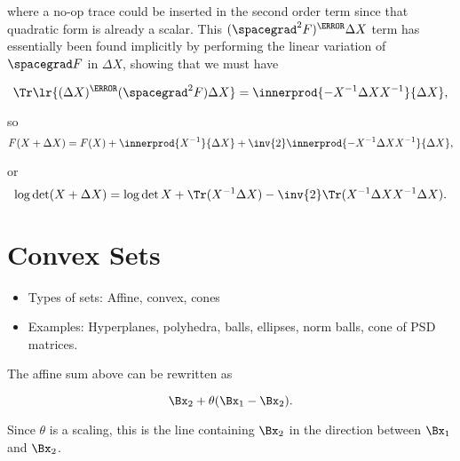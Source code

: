 where a no-op trace could be inserted in the second order term since that quadratic form is already a scalar.
This \( (\spacegrad^2 F)^\T \Delta X \) term has essentially been found implicitly by performing the linear variation of \( \spacegrad F \) in \( \Delta X \), showing that we must have

\begin{dmath}\label{eqn:convexOptimizationLecture3:900}
\Tr \lr{ (\Delta X)^\T (\spacegrad^2 F) \Delta X}
=
\innerprod{ - X^{-1} \Delta X X^{-1} }{\Delta X},
\end{dmath}

so
\begin{dmath}\label{eqn:convexOptimizationLecture3:560}
F( X + \Delta X) = F(X) +
\innerprod{X^{-1}}{\Delta X}
+\inv{2} \innerprod{-X^{-1} \Delta X X^{-1}}{\Delta X},
\end{dmath}

or
\begin{dmath}\label{eqn:convexOptimizationLecture3:580}
\log \det ( X + \Delta X) = \log \det X +
\Tr( X^{-1} \Delta X )
- \inv{2} \Tr( X^{-1} \Delta X X^{-1} \Delta X ).
\end{dmath}

\section{Convex Sets}

\begin{itemize}
\item Types of sets: Affine, convex, cones
\item Examples: Hyperplanes, polyhedra, balls, ellipses, norm balls, cone of PSD matrices.
\end{itemize}


The affine sum above can
be rewritten as

\begin{dmath}\label{eqn:convexOptimizationLecture3:600}
\Bx_2 + \theta (\Bx_1 - \Bx_2).
\end{dmath}

Since \( \theta \) is a scaling, this is the line containing \( \Bx_2 \) in the direction between \( \Bx_1 \) and \( \Bx_2 \).

